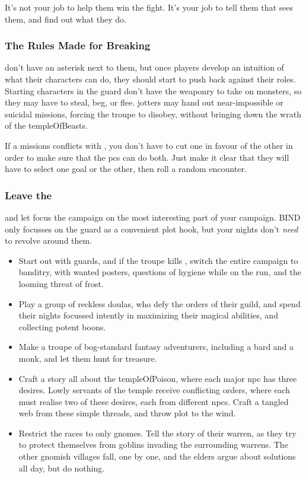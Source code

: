 \begin{multicols}{2}
It's not your job to help them win the fight.
It's your job to tell them that  sees them, and find out what they do.

\subsubsection{The Rules Made for Breaking}
don't have an asterisk next to them, but once players develop an intuition of what their characters can do, they should start to push back against their roles.
Starting characters in the \gls{guard} don't have the weaponry to take on monsters, so they may have to steal, beg, or flee.
\Glspl{jotter} may hand out near-impossible or suicidal missions, forcing the troupe to disobey, without bringing down the wrath of the \gls{templeOfBeasts}.

If a missions conflicts with , you don't have to cut one in favour of the other in order to make sure that the \glspl{pc} can do both.
Just make it clear that they will have to select one goal or the other, then roll a random encounter.

\subsubsection{Leave the }
and let focus the \gls{campaign} on the most interesting part of your \gls{campaign}.
BIND only focusses on the \gls{guard} as a convenient plot hook, but your nights don't \emph{need} to revolve around them.

\begin{itemize}
  \item
  Start out with \glspl{guard}, and if the troupe kills , switch the entire \gls{campaign} to banditry, with wanted posters, questions of hygiene while on the run, and the looming threat of frost.
  \item
  Play a group of reckless \glspl{doula}, who defy the orders of their guild, and spend their nights focussed intently in maximizing their magical abilities, and collecting potent \glspl{boon}.
  \item
  Make a troupe of bog-standard fantasy adventurers, including a bard and a monk, and let them hunt for treasure.
  \item
  Craft a story all about the \gls{templeOfPoison}, where each major \gls{npc} has three desires.
  Lowly servants of the temple receive conflicting orders, where each must realise two of these desires, each from different \glspl{npc}.
  Craft a tangled web from these simple threads, and throw plot to the wind.
  \item
  Restrict the races to only gnomes.
  Tell the story of their warren, as they try to protect themselves from goblins invading the surrounding warrens.
  The other gnomish villages fall, one by one, and the elders argue about solutions all day, but do nothing.
\end{itemize}


\end{multicols}
